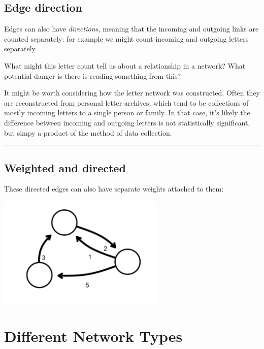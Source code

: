 \documentclass[
]{book}
\begin{document}
\hypertarget{edge-direction}{%
\subsection{Edge direction}\label{edge-direction}}

Edges can also have \emph{directions,} meaning that the incoming and outgoing links are counted separately: for example we might count incoming and outgoing letters separately.

What might this letter count tell us about a relationship in a network? What potential danger is there is reading something from this?

It might be worth considering how the letter network was constructed. Often they are reconstructed from personal letter archives, which tend to be collections of mostly incoming letters to a single person or family. In that case, it's likely the difference between incoming and outgoing letters is not statistically significant, but simpy a product of the method of data collection.

\begin{center}\rule{0.5\linewidth}{0.5pt}\end{center}

\hypertarget{weighted-and-directed}{%
\subsection{Weighted and directed}\label{weighted-and-directed}}

These directed edges can also have separate weights attached to them:

\includegraphics[width=3.125in,height=\textheight]{images/Screenshot 2022-09-26 at 11.31.15.png}

\hypertarget{different-network-types}{%
\section{Different Network Types}\label{different-network-types}}
\end{document}
